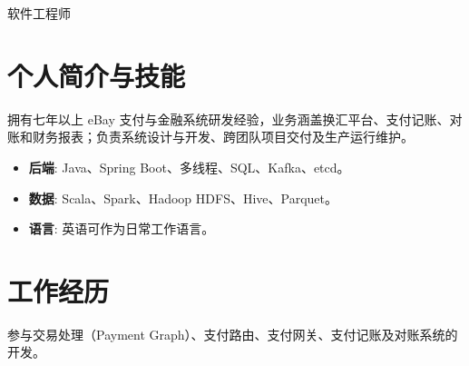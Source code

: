 \documentclass{resume}
\begin{document}

\centerline{软件工程师}
\vspace{2ex}

\section{个人简介与技能}
拥有七年以上 eBay 支付与金融系统研发经验，业务涵盖换汇平台、支付记账、对账和财务报表；负责系统设计与开发、跨团队项目交付及生产运行维护。
\begin{itemize}[parsep=0.5ex]
  \item \textbf{后端}: Java、Spring Boot、多线程、SQL、Kafka、etcd。
  \item \textbf{数据}: Scala、Spark、Hadoop HDFS、Hive、Parquet。
  \item \textbf{语言}: 英语可作为日常工作语言。
\end{itemize}

\section{工作经历}
参与交易处理（Payment Graph）、支付路由、支付网关、支付记账及对账系统的开发。
\end{document}
